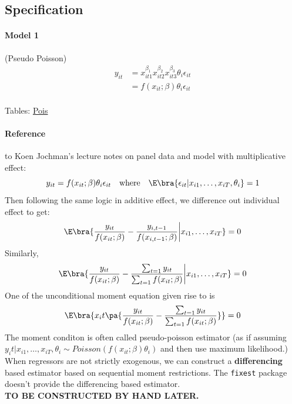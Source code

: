 \subsection{Specification}\hypertarget{home}{}
\paragraph{Model 1} (Pseudo Poisson)
\begin{equation*}
    \begin{split}
        y_{it}&=x_{it1}^{\beta_1}x_{it2}^{\beta_2}x_{it3}^{\beta_3}\theta_i\epsilon_{it}\\
        &= f(x_{it};\beta)\theta_i\epsilon_{it}\\
    \end{split}
\end{equation*}

Tables: \hyperlink{reg_inf_pois_2022}{Pois}

\paragraph{Reference} to Koen Jochman's lecture notes on panel data and model with multiplicative
effect:
\begin{equation*}
    y_{it}=f(x_{it};\beta)\theta_i\epsilon_{it} \quad \text{where} \quad \E\bra{\epsilon_{it}|x_{i1},\ldots,x_{iT},\theta_i}=1
\end{equation*}
Then following the same logic in additive effect, we difference out individual effect to get:
\begin{equation*}
    \E\bra{\frac{y_{it}}{f(x_{it};\beta)}-\frac{y_{i,t-1}}{f(x_{i,t-1};\beta)}\bigg | x_{i1},\ldots,x_{iT}}=0
\end{equation*}
Similarly, \begin{equation*}
    \E\bra{\frac{y_{it}}{f(x_{it};\beta)}-\frac{\sum_{t=1}y_{it}}{\sum_{t=1}f(x_{it};\beta)}\bigg | x_{i1},\ldots,x_{iT}}=0
\end{equation*}
One of the unconditional moment equation given rise to is \begin{equation}
    \E\bra{x_it\pa{\frac{y_{it}}{f(x_{it};\beta)}-\frac{\sum_{t=1}y_{it}}{\sum_{t=1}f(x_{it};\beta)}}}=0
\end{equation}
The moment conditon is often called pseudo-poisson estimator (as if assuming $y_it|x_{i1},\ldots,x_{iT},\theta_i\sim Poisson(f(x_{it};\beta)\theta_i)$ and then use maximum likelihood.)
When regressors are not strictly exogenous, we can construct a \textbf{differencing} based estimator based on sequential moment restrictions.
The \verb+fixest+ package doesn't provide the differencing based estimator. \\
\textbf{TO BE CONSTRUCTED BY HAND LATER.}
